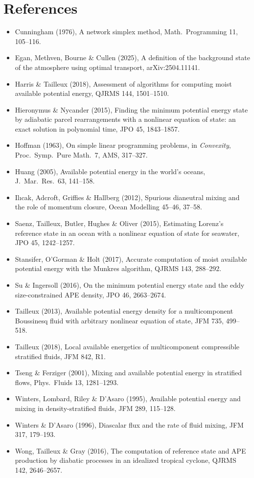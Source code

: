 \documentclass[11pt,a4paper]{article}
\begin{document}
\section*{References}
\begin{itemize}\small
  \item Cunningham (1976), A network simplex method, Math.\ Programming 11, 105--116.
  \item Egan, Methven, Bourne \& Cullen (2025), A definition of the background state of the atmosphere using optimal
        transport, arXiv:2504.11141.
  \item Harris \& Tailleux (2018), Assessment of algorithms for computing moist available potential energy, QJRMS 144, 1501--1510.
  \item Hieronymus \& Nycander (2015), Finding the minimum potential energy state by adiabatic parcel rearrangements with a
        nonlinear equation of state: an exact solution in polynomial time, JPO 45, 1843--1857.
  \item Hoffman (1963), On simple linear programming problems, in \emph{Convexity}, Proc.\ Symp.\ Pure Math.\ 7, AMS,
        317--327.
  \item Huang (2005), Available potential energy in the world's oceans, J.\ Mar.\ Res.\ 63, 141--158.
  \item Il{\i}cak, Adcroft, Griffies \& Hallberg (2012), Spurious dianeutral mixing and the role of momentum closure, Ocean
        Modelling 45--46, 37--58.
  \item Saenz, Tailleux, Butler, Hughes \& Oliver (2015), Estimating Lorenz's reference state in an ocean with a nonlinear
        equation of state for seawater, JPO 45, 1242--1257.
  \item Stansifer, O'Gorman \& Holt (2017), Accurate computation of moist available potential energy with the Munkres
        algorithm, QJRMS 143, 288--292.
  \item Su \& Ingersoll (2016), On the minimum potential energy state and the eddy size-constrained APE density, JPO 46,
        2663--2674.
  \item Tailleux (2013), Available potential energy density for a multicomponent Boussinesq fluid with arbitrary nonlinear
        equation of state, JFM 735, 499--518.
  \item Tailleux (2018), Local available energetics of multicomponent compressible stratified fluids, JFM 842, R1.
  \item Tseng \& Ferziger (2001), Mixing and available potential energy in stratified flows, Phys.\ Fluids 13, 1281--1293.
  \item Winters, Lombard, Riley \& D'Asaro (1995), Available potential energy and mixing in density-stratified fluids,
        JFM 289, 115--128.
  \item Winters \& D'Asaro (1996), Diascalar flux and the rate of fluid mixing, JFM 317, 179--193.
  \item Wong, Tailleux \& Gray (2016), The computation of reference state and APE production by diabatic processes in an
        idealized tropical cyclone, QJRMS 142, 2646--2657.
\end{itemize}
\end{document}
